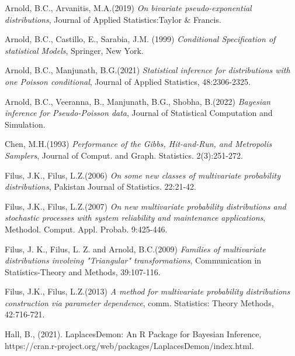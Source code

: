 \documentclass[12pt]{article}    %
\numberwithin{equation}{section}
\begin{document}
			\begin{thebibliography}{}
				Arnold, B.C., Arvanitis, M.A.(2019) \textit{On bivariate pseudo-exponential distributions},
				Journal of Applied Statistics:Taylor \& Francis.
				
				Arnold, B.C., Castillo, E., Sarabia, J.M. (1999) \textit{Conditional Specification of statistical Models}, Springer, New York.
				
				Arnold, B.C., Manjunath, B.G.(2021) \textit{Statistical inference for distributions with one Poisson conditional},
				Journal of Applied Statistics, 48:2306-2325.
				
				Arnold, B.C., Veeranna, B., Manjunath, B.G., Shobha, B.(2022) \textit{Bayesian inference for Pseudo-Poisson data},
				Journal of Statistical Computation
				and Simulation.
				
			Chen, M.H.(1993) \textit{Performance of the Gibbs, Hit-and-Run, and Metropolis Samplers},
			Journal of Comput. and Graph. Statistics. 2(3):251-272.	
				
				Filus, J.K., Filus, L.Z.(2006) \textit{On some new classes of multivariate probability distributions},
				Pakistan Journal of Statistics. 22:21-42.
				
				Filus, J.K., Filus, L.Z.(2007) \textit{On new multivariate probability distributions and stochastic processes with system reliability and maintenance applications},
				Methodol. Comput. Appl. Probab. 9:425-446.
				
				Filus, J. K., Filus, L. Z. and Arnold, B.C.(2009) \textit{Families of multivariate distributions involving "Triangular" transformations},
				Communication in Statistics-Theory and Methods, 39:107-116.
				
				Filus, J.K., Filus, L.Z.(2013) \textit{A method for multivariate probability distributions construction via parameter dependence},
				comm. Statistics: Theory Methods, 42:716-721.
				
					
				Hall, B., (2021). LaplacesDemon: An R Package for Bayesian Inference, https://cran.r-project.org/web/packages/LaplacesDemon/index.html.
				
				
				
			\end{thebibliography}		
		
\end{document}
